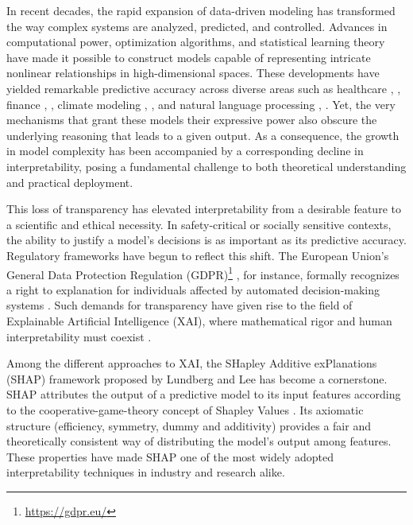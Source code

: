 \documentclass[letterpaper,11pt]{article}
\numberwithin{equation}{section}
\numberwithin{equation}{section}
\begin{document}
In recent decades, the rapid expansion of data-driven modeling has transformed the way complex systems are analyzed, predicted, and controlled. Advances in computational power, optimization algorithms, and statistical learning theory have made it possible to construct models capable of representing intricate nonlinear relationships in high-dimensional spaces. These developments have yielded remarkable predictive accuracy across diverse areas such as healthcare \cite{habehh2021machine}, \cite{saleem2020exploring}, finance \cite{dixon2020machine}, \cite{gao2024machine}, climate modeling \cite{chantry2021opportunities}, \cite{kashinath2021physics}, and natural language processing \cite{powers2012machine}, \cite{nagarhalli2021impact}. Yet, the very mechanisms that grant these models their expressive power also obscure the underlying reasoning that leads to a given output. As a consequence, the growth in model complexity has been accompanied by a corresponding decline in interpretability, posing a fundamental challenge to both theoretical understanding and practical deployment. 

This loss of transparency has elevated interpretability from a desirable feature to a scientific and ethical necessity. In safety-critical or socially sensitive contexts, the ability to justify a model's decisions is as important as its predictive accuracy. Regulatory frameworks have begun to reflect this shift. The European Union's General Data Protection Regulation (GDPR)\footnote{\url{https://gdpr.eu/}} , for instance, formally recognizes a right to explanation for individuals affected by automated decision-making systems \cite{sharma2019data}. Such demands for transparency have given rise to the field of Explainable Artificial Intelligence (XAI), where mathematical rigor and human interpretability must coexist \cite{hamon2022bridging}. 
  
Among the different approaches to XAI, the SHapley Additive exPlanations (SHAP) framework proposed by Lundberg and Lee \cite{lundberg2017unified} has become a cornerstone. SHAP attributes the output of a predictive model to its input features according to the cooperative-game-theory concept of Shapley Values \cite{shapley1953value}. Its axiomatic structure (efficiency, symmetry, dummy and additivity) provides a fair and theoretically consistent way of distributing the model's output among features. These properties have made SHAP one of the most widely adopted interpretability techniques in industry and research alike.
\end{document}
